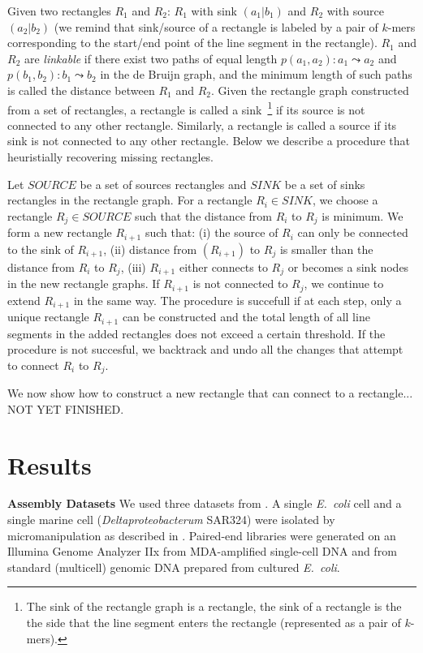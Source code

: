 \documentclass[a4paper]{article}
\def\ecoli{\emph{E.~coli}}
\begin{document}
Given two rectangles $R_1$ and $R_2$: $R_1$  with sink $(a_1|b_1)$  and $R_2$ with source  $(a_2|b_2)$ (we remind 
that sink/source of a rectangle is labeled by a pair of $k$-mers corresponding to the start/end point of the line segment in the rectangle).  
$R_1$ and $R_2$ are \emph{linkable} if there exist two paths of equal length $p(a_1, a_2): a_1 \leadsto a_2$ and $p(b_1, b_2): b_1 \leadsto b_2$
in the de Bruijn graph, and the minimum length of such paths is called the distance between $R_1$ and $R_2$. 
Given the rectangle graph constructed from a set of rectangles,  a rectangle is called a sink~\footnote{The sink of the rectangle graph is a rectangle, the sink of 
a rectangle is the the side that the line segment enters the rectangle (represented as a pair of $k$-mers).} if its source is not connected 
to any other rectangle. Similarly, a rectangle is called a source if its sink is not connected to any other rectangle. Below we describe a 
procedure that heuristially recovering missing rectangles. 

Let $SOURCE$ be a set of sources rectangles and $SINK$ be a set of sinks rectangles in the rectangle graph. 
For a rectangle $R_i \in SINK$, we choose a rectangle $R_j \in SOURCE$ such that the distance from $R_i$ to $R_j$ is minimum.
 We form a new rectangle $R_{i+1}$ 
such that: (i) the source of $R_{i}$ can only be connected to the sink of $R_{i+1}$, (ii)  distance from $(R_{i+1})$ to $R_{j}$ is smaller than
the distance from $R_i$ to $R_j$, (iii) $R_{i+1}$ either connects to $R_j$ or becomes a sink nodes in the new rectangle graphs. If $R_{i+1}$ is not
connected to $R_j$, we continue to extend $R_{i+1}$ in the same way.  The procedure is succefull if at each step, only a unique rectangle  $R_{i+1}$ 
can be constructed and the total length of all line segments in the added rectangles does not exceed a certain threshold. 
If the procedure is not succesful, we backtrack and undo all the changes that attempt to connect $R_i$ to $R_j$.

We now show how to construct a new rectangle that can connect to a rectangle...
NOT YET FINISHED.
\section{Results}

\textbf{Assembly Datasets}
We used three datasets from \cite{Chitsaz2011}.
A single {\ecoli} cell
and a single marine cell ({\em Deltaproteobacterum} SAR324)
were isolated by micromanipulation as described in \cite{Ishoey2008}.
Paired-end libraries were generated on an Illumina Genome Analyzer IIx from MDA-amplified single-cell DNA
and from standard (multicell) genomic DNA prepared from cultured {\ecoli}.
\end{document}
